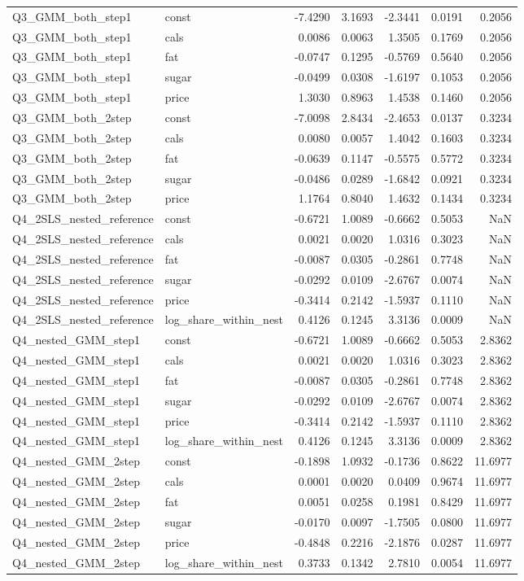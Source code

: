 \begin{longtable}{llrrrrr}
Q3_GMM_both_step1 & const & -7.4290 & 3.1693 & -2.3441 & 0.0191 & 0.2056 \\
Q3_GMM_both_step1 & cals & 0.0086 & 0.0063 & 1.3505 & 0.1769 & 0.2056 \\
Q3_GMM_both_step1 & fat & -0.0747 & 0.1295 & -0.5769 & 0.5640 & 0.2056 \\
Q3_GMM_both_step1 & sugar & -0.0499 & 0.0308 & -1.6197 & 0.1053 & 0.2056 \\
Q3_GMM_both_step1 & price & 1.3030 & 0.8963 & 1.4538 & 0.1460 & 0.2056 \\
Q3_GMM_both_2step & const & -7.0098 & 2.8434 & -2.4653 & 0.0137 & 0.3234 \\
Q3_GMM_both_2step & cals & 0.0080 & 0.0057 & 1.4042 & 0.1603 & 0.3234 \\
Q3_GMM_both_2step & fat & -0.0639 & 0.1147 & -0.5575 & 0.5772 & 0.3234 \\
Q3_GMM_both_2step & sugar & -0.0486 & 0.0289 & -1.6842 & 0.0921 & 0.3234 \\
Q3_GMM_both_2step & price & 1.1764 & 0.8040 & 1.4632 & 0.1434 & 0.3234 \\
Q4_2SLS_nested_reference & const & -0.6721 & 1.0089 & -0.6662 & 0.5053 & NaN \\
Q4_2SLS_nested_reference & cals & 0.0021 & 0.0020 & 1.0316 & 0.3023 & NaN \\
Q4_2SLS_nested_reference & fat & -0.0087 & 0.0305 & -0.2861 & 0.7748 & NaN \\
Q4_2SLS_nested_reference & sugar & -0.0292 & 0.0109 & -2.6767 & 0.0074 & NaN \\
Q4_2SLS_nested_reference & price & -0.3414 & 0.2142 & -1.5937 & 0.1110 & NaN \\
Q4_2SLS_nested_reference & log_share_within_nest & 0.4126 & 0.1245 & 3.3136 & 0.0009 & NaN \\
Q4_nested_GMM_step1 & const & -0.6721 & 1.0089 & -0.6662 & 0.5053 & 2.8362 \\
Q4_nested_GMM_step1 & cals & 0.0021 & 0.0020 & 1.0316 & 0.3023 & 2.8362 \\
Q4_nested_GMM_step1 & fat & -0.0087 & 0.0305 & -0.2861 & 0.7748 & 2.8362 \\
Q4_nested_GMM_step1 & sugar & -0.0292 & 0.0109 & -2.6767 & 0.0074 & 2.8362 \\
Q4_nested_GMM_step1 & price & -0.3414 & 0.2142 & -1.5937 & 0.1110 & 2.8362 \\
Q4_nested_GMM_step1 & log_share_within_nest & 0.4126 & 0.1245 & 3.3136 & 0.0009 & 2.8362 \\
Q4_nested_GMM_2step & const & -0.1898 & 1.0932 & -0.1736 & 0.8622 & 11.6977 \\
Q4_nested_GMM_2step & cals & 0.0001 & 0.0020 & 0.0409 & 0.9674 & 11.6977 \\
Q4_nested_GMM_2step & fat & 0.0051 & 0.0258 & 0.1981 & 0.8429 & 11.6977 \\
Q4_nested_GMM_2step & sugar & -0.0170 & 0.0097 & -1.7505 & 0.0800 & 11.6977 \\
Q4_nested_GMM_2step & price & -0.4848 & 0.2216 & -2.1876 & 0.0287 & 11.6977 \\
Q4_nested_GMM_2step & log_share_within_nest & 0.3733 & 0.1342 & 2.7810 & 0.0054 & 11.6977 \\
\end{longtable}
